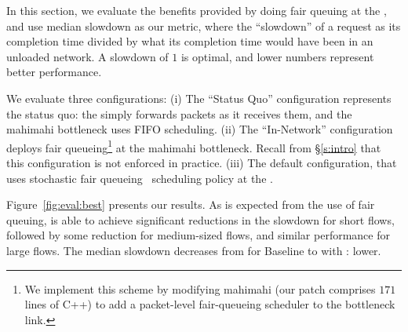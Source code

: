 %
%


\newcommand{\baseline}{Status Quo\xspace}
\newcommand{\optimal}{In-Network\xspace}



In this section, we evaluate the benefits provided by doing fair queuing at the \name, and use median slowdown as our metric, where the ``slowdown'' of a request as its completion time divided by what its completion time would have been in an unloaded network. A slowdown of $1$ is optimal, and lower numbers represent better performance.

We evaluate three configurations: 
(i) The ``\baseline'' configuration represents the status quo: the \inbox simply forwards packets as it receives them, and the mahimahi bottleneck uses FIFO scheduling.
(ii) The ``\optimal'' configuration deploys fair queueing\footnote{
We implement this scheme by modifying mahimahi (our patch comprises $171$ lines of C++) to add a packet-level fair-queueing scheduler to the bottleneck link.}
at the mahimahi bottleneck. 
Recall from \S\ref{s:intro} that this configuration is not enforced in practice.
(iii) The default \name configuration, that uses stochastic fair queueing~\cite{sfq} scheduling policy at the \inbox.


Figure~\ref{fig:eval:best} presents our results. 
As is expected from the use of fair queuing, \name is able to achieve significant reductions in the slowdown for short flows, followed by some reduction for medium-sized flows, and similar performance for large flows. 
The median slowdown
decreases from \overviewBenefitsBaselineMedian 
for Baseline to \overviewBenefitsBundlerMedian 
with \name: \overviewBenefitsBundlerMedianImprovement
lower. 

